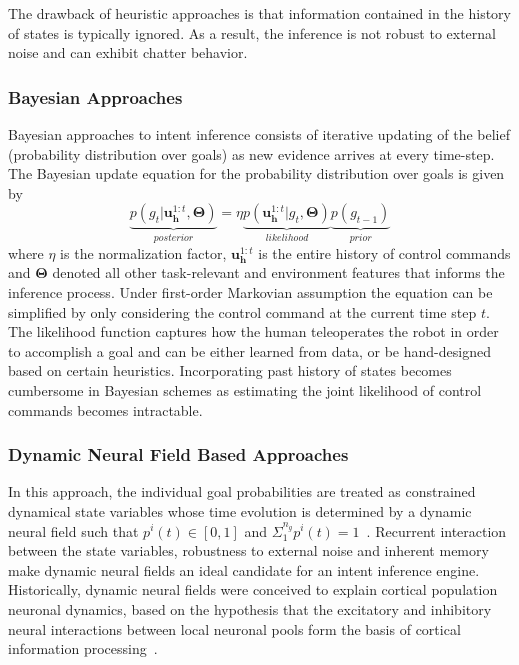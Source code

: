 \documentclass[conference]{IEEEtran}
\begin{document}
The drawback of heuristic approaches is that information contained in the history of states is typically ignored. As a result, the inference is not robust to external noise and can exhibit chatter behavior. 
\subsubsection{Bayesian Approaches}
Bayesian approaches to intent inference consists of iterative updating of the belief (probability distribution over goals) as new evidence arrives at every time-step. The Bayesian update equation for the probability distribution over goals is given by
\begin{equation*}
\underbrace{p(g_t| \boldsymbol{u}^{1:t}_{\boldsymbol{h}}, \boldsymbol{\Theta})}_{posterior} = \eta \underbrace{p(\boldsymbol{u}^{1:t}_{\boldsymbol{h}} | g_t, \boldsymbol{\Theta})}_{likelihood}\underbrace{p(g_{t-1})}_{prior}
\end{equation*}
where $\eta$ is the normalization factor, $\boldsymbol{u}^{1:t}_{\boldsymbol{h}}$ is the entire history of control commands and $\boldsymbol{\Theta}$ denoted all other task-relevant and environment features that informs the inference process. Under first-order Markovian assumption the equation can be simplified by only considering the control command at the current time step $t$. The likelihood function captures how the human teleoperates the robot in order to accomplish a goal and can be either learned from data, or be hand-designed based on certain heuristics. Incorporating past history of states becomes cumbersome in Bayesian schemes as estimating the joint likelihood of control commands becomes intractable. 
\subsubsection{Dynamic Neural Field Based Approaches}
In this approach, the individual goal probabilities are treated as constrained dynamical state variables whose time evolution is determined by a dynamic neural field such that $p^i(t) \in [0, 1]$ and $\Sigma_{1}^{n_g}p^{i}(t) = 1$~\citep{gopinath2017disamb}. Recurrent interaction between the state variables, robustness to external noise and inherent memory make dynamic neural fields an ideal candidate for an intent inference engine. Historically, dynamic neural fields were conceived to explain cortical population neuronal dynamics, based on the hypothesis that the excitatory and inhibitory neural interactions between local neuronal pools form the basis of cortical information processing~\citep{schoner1995dynamics, schoner2008dynamical}. 
\end{document}
